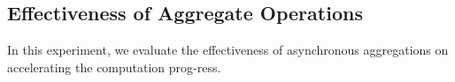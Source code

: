  \subsection{Effectiveness of Aggregate Operations}
 \label{sec:expr:aggregations}

 In this experiment, we evaluate the effectiveness of asynchronous aggregations on accelerating the computation prog-ress.

